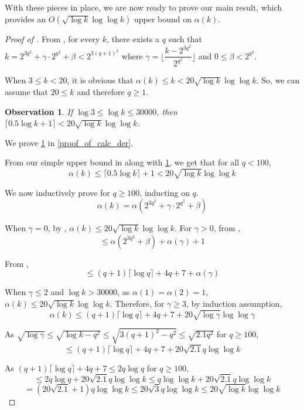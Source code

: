\documentclass[11pt,a4paper]{article}
\newtheorem{observation}[theorem]{Observation}
\theoremstyle{definition}
\begin{document}
With these pieces in place, we are now ready to prove our main result, which 
provides an $O(\sqrt{\log k}\log\log k)$ upper bound on $\alpha(k)$.

\begin{proof}[Proof of ]
	From , for every $k$, there exists a $q$ such that
	$k=2^{3q^2}+\gamma \cdot 2^{q^2}+\beta < 2^{3(q+1)^2}$ where $\gamma = 
	\lfloor \dfrac{k-2^{3q^2}}{2^{q^2}} \rfloor$ and $0 \leq \beta < 2^{q^2}$. 
	
	When $3 \le k < 20$, it is obvious that $\alpha(k) \le k < 20\sqrt{\log{k}}
	\log\log{k}$. So, we can assume that $20 \le k$ and therefore $q \ge 1$.
\begin{observation}\label{calc_der}
If $\log{3} \leq \log{k} \leq 
	30000$, then $\lceil 0.5\log{k}+1 \rceil < 20\sqrt{\log{k}}
	\log\log{k}$.   
\end{observation}    
We prove \cref{calc_der} in \cref{proof_of_calc_der}. 

From our simple upper bound in  along with \cref{calc_der}, we get that for all $q<100$,
	$$\alpha(k) \leq \lceil 0.5\log{k} \rceil+1 < 20\sqrt{\log{k}}\log\log{k}$$
	
	We now inductively prove  for $q \geq 100$, inducting on 
	$q$. 
	$$\alpha(k) = \alpha(2^{3q^2}+\gamma \cdot 2^{q^2}+\beta)$$
	
	When ${\gamma}=0$, by , $\alpha(k) \leq 
	20\sqrt{\log{k}}\log\log{k}$. For ${\gamma}>0$, from , 
	$$ \leq \alpha(2^{3q^2}+\beta)+ \alpha(\gamma)+1$$
	
	From , 
	$$ \leq (q+1) \lceil \log{q} \rceil+4q+7 + \alpha(\gamma)$$
	
	When ${\gamma}\leq 2$ and $\log{k} > 30000$, as $\alpha(1)=\alpha(2)=1$, 
	$\alpha(k) \leq 20\sqrt{\log{k}}\log\log{k}$. Therefore, for ${\gamma} \geq 
	3$, by induction assumption,
	$$ \alpha(k) \leq (q+1) \lceil \log{q} \rceil+4q+7 + 20\sqrt{\log \gamma}
	\log\log{\gamma} $$
	
	As $\sqrt{\log{\gamma}} \leq \sqrt{\log{k} -q^2} \leq \sqrt{3(q+1)^2-q^2} 
	\leq \sqrt{2.1q^2}$ for $q\geq 100$,  
	$$ \leq (q+1) \lceil \log{q} \rceil+4q+7 + 20\sqrt{2.1}q\log\log{k}$$
	
	As $(q+1) \lceil \log{q} \rceil+4q+7 \leq 2q\log{q}$ for $q \geq 100$,
	$$ \leq 2q\log{q} + 20\sqrt{2.1}q\log\log{k} \leq q\log\log{k} + 
	20\sqrt{2.1}q\log\log{k}$$
	$$ =(20\sqrt{2.1}+1)q\log\log{k} \leq 20\sqrt{3}q\log\log{k} \leq 
	20\sqrt{\log k}\log\log{k}$$
\end{proof}
\end{document}
